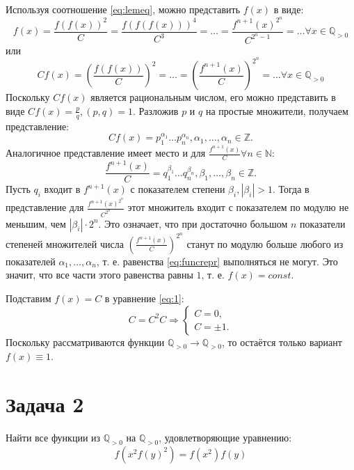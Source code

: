\documentclass[11pt]{article}
\def\zall{\setcounter{lem}{0}\setcounter{cnsqnc}{0}\setcounter{th}{0}\setcounter{Cmt}{0}\setcounter{equation}{0}}
\newcounter{lem}\setcounter{lem}{0}
\newcounter{th}\setcounter{th}{0}
\newcounter{cnsqnc}\setcounter{cnsqnc}{0}
\newcounter{Cmt}\setcounter{Cmt}{0}
\begin{document}
Используя соотношение \eqref{eq:lemeq}, можно представить \(f(x)\) в виде:
\begin{equation*}
f(x) = \frac{f(f(x))^2}C = \frac{f(f(f(x)))^4}{C^3} = \ldots = \frac{f^{n + 1}(x)^{2^n}}{C^{2^n - 1}} = \ldots \forall x \in \mathbb{Q}_{>0}
\end{equation*}
или
\begin{equation*}
Cf(x) = \left(\frac{f(f(x))}C\right)^2 = \ldots = \left(\frac{f^{n + 1}(x)}C\right)^{2^n} = \ldots \forall x \in \mathbb{Q}_{>0}
\end{equation*}
Поскольку \(Cf(x)\) является рациональным числом, его можно представить в виде \(Cf(x) = \frac{p}q, (p, q) = 1\). Разложив \(p\) и \(q\) на простые множители, получаем представление:
\begin{equation}\label{eq:funcrepr}
Cf(x) = p_1^{\alpha_1}\ldots p_n^{\alpha_n}, \alpha_1, \ldots, \alpha_n \in \mathbb{Z}.
\end{equation}
Аналогичное представление имеет место и для \(\frac{f^{n + 1}(x)}C \forall n \in \mathbb{N}\):
\begin{equation*}
\frac{f^{n + 1}(x)}C = q_1^{\beta_1}\ldots q_n^{\beta_n}, \beta_1, \ldots, \beta_n \in \mathbb{Z}.
\end{equation*}
Пусть \(q_i\) входит в \(f^{n + 1}(x)\) с показателем степени \(\beta_i, |\beta_i| > 1\). Тогда в представление для \(\frac{f^{n + 1}(x)^{2^n}}{C^{2^n}}\) этот множитель входит с показателем по модулю не меньшим, чем \(|\beta_i|\cdot2^{n}\). Это означает, что при достаточно большом \(n\) показатели степеней множителей числа \(\left(\frac{f^{n + 1}(x)}C\right)^{2^n}\) станут по модулю больше любого из показателей \(\alpha_1, \ldots, \alpha_n\), т. е. равенства \eqref{eq:funcrepr} выполняться не могут. Это значит, что все части этого равенства равны \(1\), т. е. \(f(x) = const\).

Подставим \(f(x) = C\) в уравнение \eqref{eq:1}:
\begin{equation*}
C = C^2C \Rightarrow \begin{cases}C = 0, \\
C = \pm 1.
\end{cases}
\end{equation*}
Поскольку рассматриваются функции $\mathbb{Q}_{>0} \to \mathbb{Q}_{>0}$, то остаётся только вариант $f(x) \equiv 1$.

\pagebreak
\section{Задача 2}
\label{sec:org5b4482c}
\zall
Найти все функции из \(\mathbb{Q}_{>0}\) на \(\mathbb{Q}_{>0}\), удовлетворяющие уравнению:
\begin{equation}\label{eq:2}
f(x^2f(y)^2) = f(x^2)f(y)
\end{equation}
\end{document}
